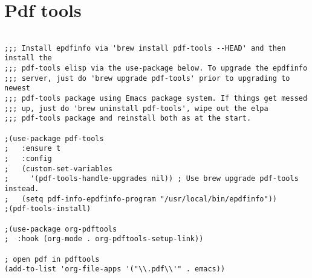 \documentclass[11pt]{article}
\begin{document}
\section{Pdf tools}
\label{sec:org8479677}
\begin{verbatim}

;;; Install epdfinfo via 'brew install pdf-tools --HEAD' and then install the
;;; pdf-tools elisp via the use-package below. To upgrade the epdfinfo
;;; server, just do 'brew upgrade pdf-tools' prior to upgrading to newest
;;; pdf-tools package using Emacs package system. If things get messed
;;; up, just do 'brew uninstall pdf-tools', wipe out the elpa
;;; pdf-tools package and reinstall both as at the start.

;(use-package pdf-tools
; 	:ensure t
;	:config
;	(custom-set-variables
;	  '(pdf-tools-handle-upgrades nil)) ; Use brew upgrade pdf-tools instead.
;   (setq pdf-info-epdfinfo-program "/usr/local/bin/epdfinfo"))
;(pdf-tools-install)

;(use-package org-pdftools
;  :hook (org-mode . org-pdftools-setup-link))

; open pdf in pdftools 
(add-to-list 'org-file-apps '("\\.pdf\\'" . emacs))

\end{verbatim}
\end{document}
